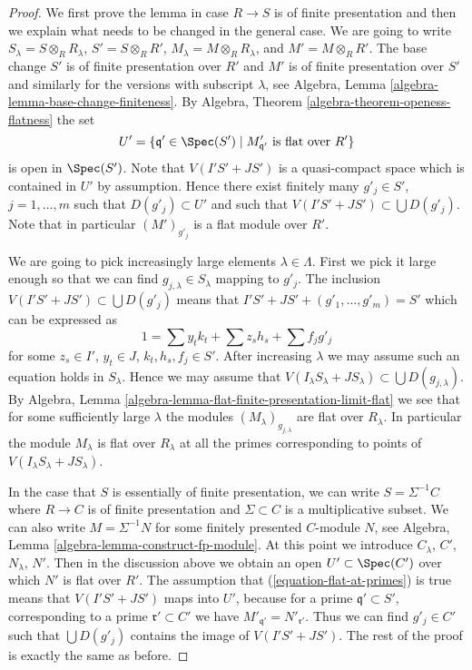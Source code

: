 \begin{proof}
We first prove the lemma in case $R \to S$ is of finite presentation
and then we explain what needs to be changed in the general case.
We are going to write $S_\lambda = S \otimes_R R_\lambda$,
$S' = S \otimes_R R'$, $M_\lambda = M \otimes_R R_\lambda$, and
$M' = M \otimes_R R'$.
The base change $S'$ is of finite presentation over $R'$ and
$M'$ is of finite presentation over $S'$ and similarly for the
versions with subscript $\lambda$, see
Algebra, Lemma \ref{algebra-lemma-base-change-finiteness}.
By
Algebra, Theorem \ref{algebra-theorem-openess-flatness}
the set
$$
U' = \{\mathfrak q' \in \Spec(S') \mid
M'_{\mathfrak q'}\text{ is flat over }R'\}
$$
is open in $\Spec(S')$. Note that $V(I'S' + JS')$
is a quasi-compact space which is contained in $U'$ by assumption.
Hence there exist finitely many $g'_j \in S'$, $j = 1, \ldots, m$
such that $D(g'_j) \subset U'$ and such
that $V(I'S' + JS') \subset \bigcup D(g'_j)$.
Note that in particular $(M')_{g'_j}$ is a flat module over $R'$.

\medskip\noindent
We are going to pick increasingly large elements $\lambda \in \Lambda$.
First we pick it large enough so that we can find
$g_{j, \lambda} \in S_{\lambda}$ mapping to $g'_j$.
The inclusion $V(I'S' + JS') \subset \bigcup D(g'_j)$ means that
$I'S' + JS' + (g'_1, \ldots, g'_m) = S'$ which can be expressed as
$$
1 = \sum y_tk_t + \sum z_sh_s + \sum f_jg'_j
$$
for some $z_s \in I'$, $y_t \in J$, $k_t, h_s, f_j \in S'$.
After increasing $\lambda$ we may assume such an equation holds in
$S_\lambda$. Hence we may assume that
$V(I_\lambda S_\lambda + J S_\lambda) \subset \bigcup D(g_{j, \lambda})$. By
Algebra, Lemma \ref{algebra-lemma-flat-finite-presentation-limit-flat}
we see that for some sufficiently large $\lambda$ the modules
$(M_\lambda)_{g_{j, \lambda}}$ are flat over $R_\lambda$.
In particular the module $M_\lambda$ is flat over $R_\lambda$
at all the primes corresponding to points of
$V(I_\lambda S_\lambda + J S_\lambda)$.

\medskip\noindent
In the case that $S$ is essentially of finite presentation, we can write
$S = \Sigma^{-1}C$ where $R \to C$ is of finite presentation and
$\Sigma \subset C$ is a multiplicative subset. We can also write
$M = \Sigma^{-1}N$ for some finitely presented $C$-module $N$, see
Algebra, Lemma \ref{algebra-lemma-construct-fp-module}.
At this point we introduce $C_\lambda$, $C'$, $N_\lambda$, $N'$. Then in
the discussion above we obtain an open $U' \subset \Spec(C')$
over which $N'$ is flat over $R'$. The assumption that
(\ref{equation-flat-at-primes}) is true means that $V(I'S' + JS')$ maps
into $U'$, because for a prime $\mathfrak q' \subset S'$, corresponding
to a prime $\mathfrak r' \subset C'$ we have
$M'_{\mathfrak q'} = N'_{\mathfrak r'}$. Thus we can find
$g'_j \in C'$ such that $\bigcup D(g'_j)$ contains the image of
$V(I'S' + JS')$. The rest of the proof is exactly the same as before.
\end{proof}


